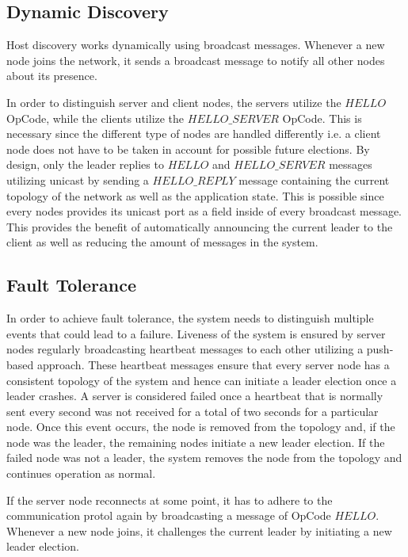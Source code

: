 \documentclass[runningheads]{llncs}
\begin{document}
\subsection{Dynamic Discovery}

Host discovery works dynamically using broadcast messages.
Whenever a new node joins the network, it sends a broadcast message to notify
all other nodes about its presence.

In order to distinguish server and client
nodes, the servers utilize the $HELLO$ OpCode, while the clients utilize the
$HELLO\_SERVER$ OpCode. This is necessary since the different type of nodes are
handled differently i.e. a client node does not have to be taken in account for
possible future elections. By design, only the leader replies to $HELLO$ and
$HELLO\_SERVER$ messages utilizing unicast by sending a $HELLO\_REPLY$ message
containing the current topology of the network as well as the application
state. This is possible since every nodes provides its unicast port as a field
inside of every broadcast message. This provides the benefit of automatically
announcing the current leader to the client as well as reducing the amount of
messages in the system.

\subsection{Fault Tolerance}

In order to achieve fault tolerance, the system needs to distinguish multiple
events that could lead to a failure. Liveness of the system is ensured by
server nodes regularly broadcasting heartbeat messages to each other utilizing a push-based approach. These
heartbeat messages ensure that every server node has a consistent topology of
the system and hence can initiate a leader election once a leader crashes.
A server is considered failed once a heartbeat that is normally sent every
second was not received for a total of two seconds for a particular node.
Once this event occurs, the node is removed from the topology and, if the node
was the leader, the remaining nodes initiate a new leader election.
If the failed node was not a leader, the system removes the node from the
topology and continues operation as normal.

If the server node reconnects at some point, it has to adhere to the
communication protol again by broadcasting a message of OpCode $HELLO$. 
Whenever a new node joins, it challenges the current leader by initiating a new
leader election.
\end{document}
